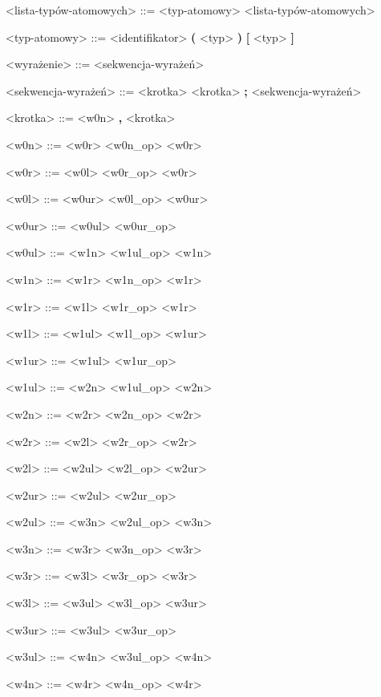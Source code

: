 \documentclass[12pt]{article}
\begin{document}
\begin{grammar}
<lista-typów-atomowych> ::=
    <typ-atomowy>
     <lista-typów-atomowych>

<typ-atomowy> ::=
    <identifikator>
    \alt \textbf{(} <typ> \textbf{)}
    \alt \textbf{[} <typ> \textbf{]}

<wyrażenie> ::=
    <sekwencja-wyrażeń>

<sekwencja-wyrażeń> ::=
    <krotka>
    \alt <krotka> \textbf{;} <sekwencja-wyrażeń>

<krotka> ::=
    <w0n>
     \textbf{,} <krotka>

<w0n> ::=
    <w0r>
     <w0n_op> <w0r>

<w0r> ::=
    <w0l>
     <w0r_op> <w0r>

<w0l> ::=
    <w0ur>
     <w0l_op> <w0ur>

<w0ur> ::=
    <w0ul>
     <w0ur_op> 
    
<w0ul> ::=
    <w1n>
    \alt <w1ul_op> <w1n>

<w1n> ::=
    <w1r>
     <w1n_op> <w1r>

<w1r> ::=
    <w1l>
     <w1r_op> <w1r>

<w1l> ::=
    <w1ul>
     <w1l_op> <w1ur>

<w1ur> ::=
    <w1ul>
     <w1ur_op> 
    
<w1ul> ::=
    <w2n>
    \alt <w1ul_op> <w2n>

<w2n> ::=
    <w2r>
     <w2n_op> <w2r>

<w2r> ::=
    <w2l>
     <w2r_op> <w2r>

<w2l> ::=
    <w2ul>
     <w2l_op> <w2ur>

<w2ur> ::=
    <w2ul>
     <w2ur_op> 
    
<w2ul> ::=
    <w3n>
    \alt <w2ul_op> <w3n>

    <w3n> ::=
    <w3r>
     <w3n_op> <w3r>

<w3r> ::=
    <w3l>
     <w3r_op> <w3r>

<w3l> ::=
    <w3ul>
     <w3l_op> <w3ur>

<w3ur> ::=
    <w3ul>
     <w3ur_op> 
    
<w3ul> ::=
    <w4n>
    \alt <w3ul_op> <w4n>

<w4n> ::=
    <w4r>
     <w4n_op> <w4r>


\end{grammar}
\end{document}
